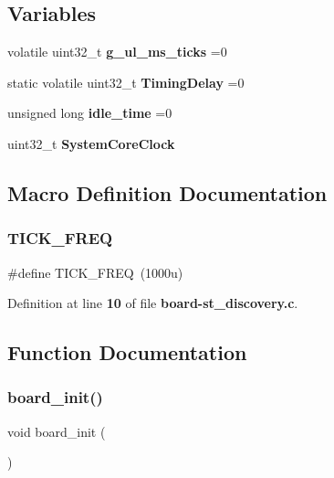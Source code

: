 \subsection*{Variables}
\begin{DoxyCompactItemize}
\item 
volatile uint32\+\_\+t \textbf{ g\+\_\+ul\+\_\+ms\+\_\+ticks} =0
\item 
static volatile uint32\+\_\+t \textbf{ Timing\+Delay} =0
\item 
unsigned long \textbf{ idle\+\_\+time} =0
\item 
uint32\+\_\+t \textbf{ System\+Core\+Clock}
\end{DoxyCompactItemize}


\subsection{Macro Definition Documentation}
\mbox{\label{board-st__discovery_8c_a27e7c563065e8d600f40473a13c9f762}} 
\subsubsection{T\+I\+C\+K\+\_\+\+F\+R\+EQ}
{\footnotesize\ttfamily \#define T\+I\+C\+K\+\_\+\+F\+R\+EQ~(1000u)}



Definition at line \textbf{ 10} of file \textbf{ board-\/st\+\_\+discovery.\+c}.



\subsection{Function Documentation}
\mbox{\label{board-st__discovery_8c_ad7d81512b0ce3a7214547801a3e41264}} 
\subsubsection{board\+\_\+init()}
{\footnotesize\ttfamily void board\+\_\+init (\begin{DoxyParamCaption}{ }\end{DoxyParamCaption})}



